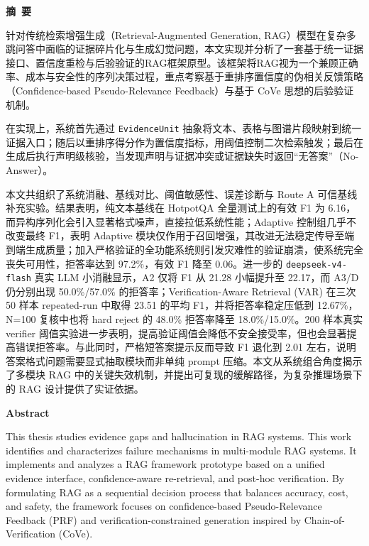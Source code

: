 \cleardoublepage{}
\begin{center}
    \bfseries {} 摘~要
\end{center}

针对传统检索增强生成（Retrieval-Augmented Generation, RAG）模型在复杂多跳问答中面临的证据碎片化与生成幻觉问题，本文实现并分析了一套基于统一证据接口、置信度重检与后验验证的RAG框架原型。该框架将RAG视为一个兼顾正确率、成本与安全性的序列决策过程，重点考察基于重排序置信度的伪相关反馈策略（Confidence-based Pseudo-Relevance Feedback）与基于 CoVe 思想的后验验证机制。

在实现上，系统首先通过 \texttt{EvidenceUnit} 抽象将文本、表格与图谱片段映射到统一证据入口；随后以重排序得分作为置信度指标，用阈值控制二次检索触发；最后在生成后执行声明级核验，当发现声明与证据冲突或证据缺失时返回“无答案”（No-Answer）。

本文共组织了系统消融、基线对比、阈值敏感性、误差诊断与 Route A 可信基线补充实验。结果表明，纯文本基线在 HotpotQA 全量测试上的有效 F1 为 6.16，而异构序列化会引入显著格式噪声，直接拉低系统性能；Adaptive 控制组几乎不改变最终 F1，表明 Adaptive 模块仅作用于召回增强，其改进无法稳定传导至端到端生成质量；加入严格验证的全功能系统则引发灾难性的验证崩溃，使系统完全丧失可用性，拒答率达到 97.2\%，有效 F1 降至 0.06。进一步的 \texttt{deepseek-v4-flash} 真实 LLM 小消融显示，A2 仅将 F1 从 21.28 小幅提升至 22.17，而 A3/D 仍分别出现 50.0\%/57.0\% 的拒答率；Verification-Aware Retrieval (VAR) 在三次 50 样本 repeated-run 中取得 23.51 的平均 F1，并将拒答率稳定压低到 12.67\%，N=100 复核中也将 hard reject 的 48.0\% 拒答率降至 18.0\%/15.0\%。200 样本真实 verifier 阈值实验进一步表明，提高验证阈值会降低不安全接受率，但也会显著提高错误拒答率。与此同时，严格短答案提示反而导致 F1 退化到 2.01 左右，说明答案格式问题需要显式抽取模块而非单纯 prompt 压缩。本文从系统组合角度揭示了多模块 RAG 中的关键失效机制，并提出可复现的缓解路径，为复杂推理场景下的 RAG 设计提供了实证依据。

\cleardoublepage{}
\begin{center}
    \bfseries {} Abstract
\end{center}

This thesis studies evidence gaps and hallucination in RAG systems. This work identifies and characterizes failure mechanisms in multi-module RAG systems. It implements and analyzes a RAG framework prototype based on a unified evidence interface, confidence-aware re-retrieval, and post-hoc verification. By formulating RAG as a sequential decision process that balances accuracy, cost, and safety, the framework focuses on confidence-based Pseudo-Relevance Feedback (PRF) and verification-constrained generation inspired by Chain-of-Verification (CoVe).


